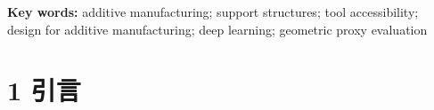 \documentclass[UTF8,a4paper,twocolumn]{ctexart}
\begin{document}
\noindent\textbf{Key words:} additive manufacturing; support structures; tool accessibility; design for additive manufacturing; deep learning; geometric proxy evaluation

\clearpage
\twocolumn

\section{1 引言}
\makeatletter
\long\def\SAFskipheading#1\par{}
\def\#{\@ifnextchar\#{\SAFskipheading}{}}
\makeatother

\end{document}
